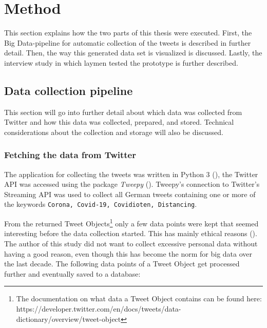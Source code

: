 \section{Method}
This section explains how the two parts of this thesis were executed. First, the Big Data-pipeline for automatic collection of the tweets is described in further detail. Then, the way this generated data set is visualized is discussed. Lastly, the interview study in which laymen tested the prototype is further described.

\subsection{Data collection pipeline}
This section will go into further detail about which data was collected from Twitter and how this data was collected, prepared, and stored. Technical considerations about the collection and storage will also be discussed.

\subsubsection{Fetching the data from Twitter} \label{sec:fetchedData}
The application for collecting the tweets was written in Python 3 (\cite{10.5555/1593511}), the Twitter API was accessed using the package \emph{Tweepy} (\cite{roesslein2020tweepy}). Tweepy's connection to Twitter's Streaming API was used to collect all German tweets containing one or more of the keywords \verb+Corona, Covid-19, Covidioten, Distancing+.

From the returned Tweet Objects\footnote{The documentation on what data a Tweet Object contains can be found here: https://developer.twitter.com/en/docs/tweets/data-dictionary/overview/tweet-object} only a few data points were kept that seemed interesting before the data collection started. This has mainly ethical reasons (\cite{richards2014big}). The author of this study did not want to collect excessive personal data without having a good reason, even though this has become the norm for big data over the last decade. The following data points of a Tweet Object get processed further and eventually saved to a database:

